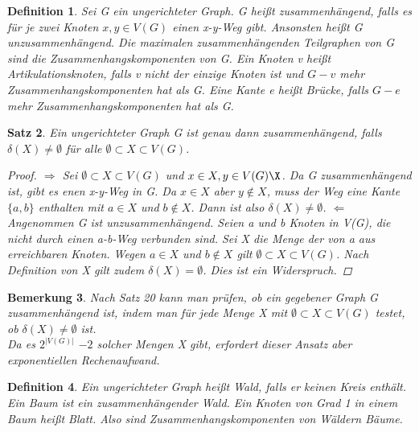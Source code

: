 \documentclass{article}
\newtheorem{satz}{Satz}
\newtheorem{bemerkung}[satz]{Bemerkung}
\newtheorem{definition}[satz]{Definition}
\begin{document}
    \begin{definition} \lable
      Sei G ein ungerichteter Graph.
      G heißt zusammenhängend, falls es für je zwei Knoten $x,y \in V(G)$ einen x-y-Weg gibt.
      Ansonsten heißt G unzusammenhängend.
      Die maximalen zusammenhängenden Teilgraphen von G sind die Zusammenhangskomponenten von G.
      Ein Knoten v heißt Artikulationsknoten, falls v nicht der einzige Knoten ist und $G-v$ mehr Zusammenhangskomponenten hat als G.
      Eine Kante e heißt Brücke, falls $G-e$ mehr Zusammenhangskomponenten hat als G.
    \end{definition}
    \vspace{\baselineskip}

    \begin{satz}
    Ein ungerichteter Graph G ist genau dann zusammenhängend, falls $\delta (X)\neq \emptyset$ für alle $\emptyset \subset X\subset V(G)$.
    \begin {proof}
    $\Rightarrow$ Sei  $\emptyset \subset X\subset V(G)$ und $x\in X, y\in V(G)\X$. 
    Da G zusammenhängend ist, gibt es enen x-y-Weg in G.
    Da $x\in X$ aber $y\notin X$, muss der Weg eine Kante $\{a,b\}$ enthalten mit $a\in X$ und $b\notin X$.
    Dann ist also $\delta (X)\neq \emptyset$.
    $\Leftarrow$ Angenommen G ist unzusammenhängend. Seien a und b Knoten in V(G), die nicht durch einen a-b-Weg verbunden sind.
    Sei X die Menge der von a aus erreichbaren Knoten.
    Wegen $a\in X$ und $b\notin X$ gilt $\emptyset \subset X\subset V(G)$.
    Nach Definition von X gilt zudem $\delta (X)= \emptyset$.
    Dies ist ein Widerspruch.
    \end {proof}
    \end{satz}
  \vspace{\baselineskip}
  
  \begin{bemerkung} 
    Nach Satz 20 kann man prüfen, ob ein gegebener Graph G zusammenhängend ist, indem man für jede Menge X mit $\emptyset \subset X\subset V(G)$ testet, ob $\delta(X) \neq \emptyset$ ist.\\
    Da es  $2^{|V(G)|}$ $-2$ solcher Mengen X gibt, erfordert dieser Ansatz aber exponentiellen Rechenaufwand. 
    \end {bemerkung}
  \vspace{\baselineskip}
  
  \begin{definition}
    Ein ungerichteter Graph heißt Wald, falls er keinen Kreis enthält.
    Ein Baum ist ein zusammenhängender Wald.
    Ein Knoten von Grad 1 in einem Baum heißt Blatt.
    Also sind Zusammenhangskomponenten von Wäldern Bäume.
  \end{definition}
  \vspace{\baselineskip}
\end{document}
